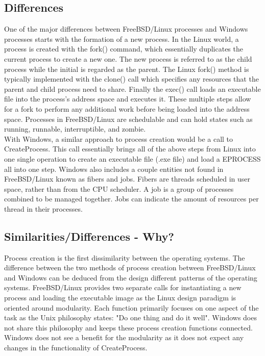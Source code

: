 \documentclass[letterpaper,10pt,titlepage]{article}
\begin{document}
\subsection{Differences}

One of the major differences between FreeBSD/Linux processes and Windows processes starts with the formation of a new process.  In the Linux world, a process is created with the fork() command, which essentially duplicates the current process to create a new one.  The new process is referred to as the child process while the initial is regarded as the parent.  The Linux fork() method is typically implemented with the clone() call which specifies any resources that the parent and child process need to share.  Finally the exec() call loads an executable file into the process's address space and executes it.  These multiple steps allow for a fork to perform any additional work before being loaded into the address space.  Processes in FreeBSD/Linux are schedulable and can hold states such as running, runnable, interruptible, and zombie.\cite{lkd3}\\

With Windows, a similar approach to process creation would be a call to CreateProcess.  This call essentially brings all of the above steps from Linux into one single operation to create an executable file (.exe file) and load a EPROCESS all into one step.\cite{mwi5}  Windows also includes a couple entities not found in FreeBSD/Linux known as fibers and jobs.  Fibers are threads scheduled in user space, rather than from the CPU scheduler.  A job is a group of processes combined to be managed together.  Jobs can indicate the amount of resources per thread in their processes.

\subsection{Similarities/Differences - Why?}

Process creation is the first dissimilarity between the operating systems.  The difference between the two methods of process creation between FreeBSD/Linux and Windows can be deduced from the design different patterns of the operating systems.  FreeBSD/Linux provides two separate calls for instantiating a new process and loading the executable image as the Linux design paradigm is oriented around modularity.  Each function primarily focuses on one aspect of the task as the Unix philosophy states: "Do one thing and do it well".\cite{philosophy}  Windows does not share this philosophy and keeps these process creation functions connected.  Windows does not see a benefit for the modularity as it does not expect any changes in the functionality of CreateProcess.\\
\end{document}
